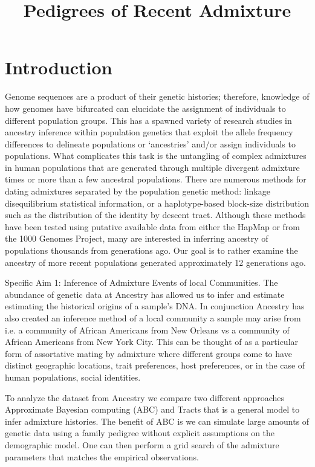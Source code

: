 \documentclass{article}
\begin{document}
\title{Pedigrees of Recent Admixture}
\maketitle

\section{Introduction}

Genome sequences are a product of their genetic histories; therefore, knowledge of how genomes have bifurcated can elucidate the assignment of individuals to different population groups.  This has a spawned variety of research studies in ancestry inference within population genetics that exploit the allele frequency differences to delineate populations or ‘ancestries’ and/or assign individuals to populations.  What complicates this task is the untangling of complex admixtures in human populations that are generated through multiple divergent admixture times or more than a few ancestral populations.  There are numerous methods for dating admixtures separated by the population genetic method: linkage disequilibrium statistical information, or a haplotype-based block-size distribution such as the distribution of the identity by descent tract.  Although these methods have been tested using putative available data from either the HapMap or from the 1000 Genomes Project, many are interested in inferring ancestry of populations thousands from generations ago.  Our goal is to  rather examine the ancestry of more recent populations generated approximately 12 generations ago.  


Specific Aim 1: Inference of Admixture Events of local Communities.  The abundance of genetic data at Ancestry has allowed us to infer and estimate estimating the historical origins of a sample’s DNA.   In conjunction Ancestry has also created an inference method of a local community a sample may arise from i.e. a community of African Americans from New Orleans vs a community of African Americans from New York City.   This can be thought of as a particular form of assortative mating by admixture where different groups come to have distinct geographic locations, trait preferences, host preferences, or in the case of human populations, social identities.  

To analyze the dataset from Ancestry we compare two different approaches Approximate Bayesian computing (ABC) and Tracts that is a general model to infer admixture histories.  The benefit of ABC is we can simulate large amounts of genetic data using a family pedigree without explicit assumptions on the demographic model.  One can then perform a grid search of the admixture parameters that matches the empirical observations.  
\end{document}

